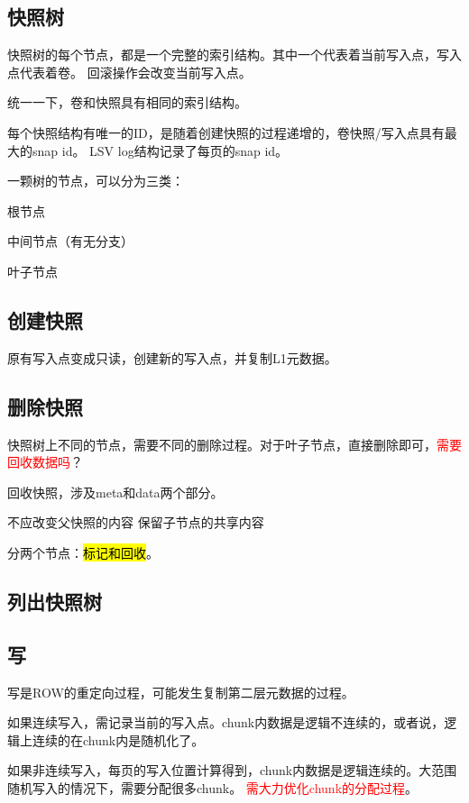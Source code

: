 \subsection{快照树}

快照树的每个节点，都是一个完整的索引结构。其中一个代表着当前写入点，写入点代表着卷。
回滚操作会改变当前写入点。

统一一下，卷和快照具有相同的索引结构。

每个快照结构有唯一的ID，是随着创建快照的过程递增的，卷快照/写入点具有最大的snap id。
LSV log结构记录了每页的snap id。

一颗树的节点，可以分为三类：
\begin{compactenum}
\item 根节点
\item 中间节点（有无分支）
\item 叶子节点
\end{compactenum}

\subsection{创建快照}

原有写入点变成只读，创建新的写入点，并复制L1元数据。

\subsection{删除快照}

快照树上不同的节点，需要不同的删除过程。对于叶子节点，直接删除即可，\textcolor{red}{需要回收数据吗}？

回收快照，涉及meta和data两个部分。

不应改变父快照的内容
保留子节点的共享内容

分两个节点：\hl{标记和回收}。

\subsection{列出快照树}

\subsection{写}

写是ROW的重定向过程，可能发生复制第二层元数据的过程。

如果连续写入，需记录当前的写入点。chunk内数据是逻辑不连续的，或者说，逻辑上连续的在chunk内是随机化了。

如果非连续写入，每页的写入位置计算得到，chunk内数据是逻辑连续的。大范围随机写入的情况下，需要分配很多chunk。
\textcolor{red}{需大力优化chunk的分配过程}。

